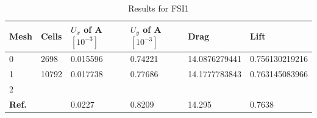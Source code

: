 \begin{table}[!ht]
\begin{center}
  \begin{tabular}{|l | l | l | l | l | l|} \hline
	Mesh & Cells & $U_x$ of A $[10^{-3}]$ & $U_y$ of A $[10^{-3}]$ & Drag & Lift\\ \hline
    0  & 2698 & 0.015596 & 0.74221 & 14.0876279441 & 0.756130219216 \\   \hline
    1 & 10792 & 0.017738 & 0.77686 & 14.1777783843 & 0.763145083966 \\ \hline
    2 &  & $ $&  $ $ & $ $ & $ $   \\ \hline \hline
    \textbf{Ref.}  & & 0.0227 & 0.8209 & 14.295 & 0.7638\\ \hline 
    \hline
  \end{tabular}	
\caption{Results for FSI1}
\end{center}
\end{table}

